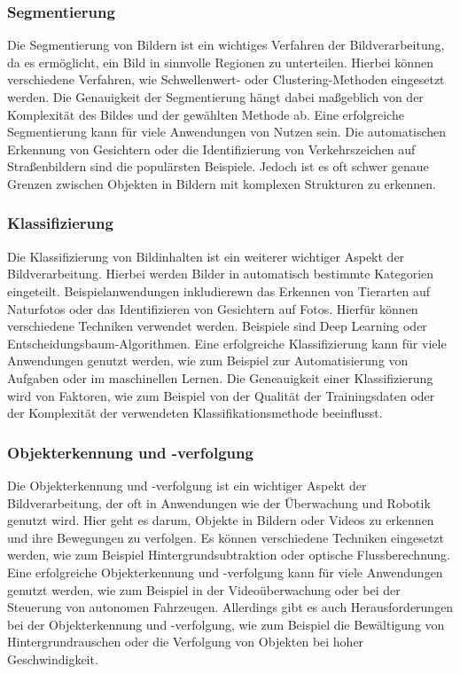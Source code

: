 \subsubsection{Segmentierung}

Die Segmentierung von Bildern ist ein wichtiges Verfahren der Bildverarbeitung, da es ermöglicht, ein Bild in sinnvolle Regionen zu unterteilen. 
Hierbei können verschiedene Verfahren, wie Schwellenwert- oder Clustering-Methoden eingesetzt werden. 
Die Genauigkeit der Segmentierung hängt dabei maßgeblich von der Komplexität des Bildes und der gewählten Methode ab.
Eine erfolgreiche Segmentierung kann für viele Anwendungen von Nutzen sein.
Die automatischen Erkennung von Gesichtern oder die Identifizierung von Verkehrszeichen auf Straßenbildern sind die populärsten Beispiele.
Jedoch ist es oft schwer genaue Grenzen zwischen Objekten in Bildern mit komplexen Strukturen zu erkennen.

\subsubsection{Klassifizierung}

Die Klassifizierung von Bildinhalten ist ein weiterer wichtiger Aspekt der Bildverarbeitung.
Hierbei werden Bilder in automatisch bestimmte Kategorien eingeteilt. 
Beispielanwendungen inkludierewn das Erkennen von Tierarten auf Naturfotos oder das Identifizieren von Gesichtern auf Fotos. 
Hierfür können verschiedene Techniken verwendet werden. Beispiele sind Deep Learning oder Entscheidungsbaum-Algorithmen.
Eine erfolgreiche Klassifizierung kann für viele Anwendungen genutzt werden, wie zum Beispiel zur Automatisierung von Aufgaben oder im maschinellen Lernen. 
Die Geneauigkeit einer Klassifizierung wird von Faktoren, wie zum Beispiel von der Qualität der Trainingsdaten oder der Komplexität der verwendeten Klassifikationsmethode beeinflusst.

\subsubsection{Objekterkennung und -verfolgung}

Die Objekterkennung und -verfolgung ist ein wichtiger Aspekt der Bildverarbeitung, der oft in Anwendungen wie der Überwachung und Robotik genutzt wird. 
Hier geht es darum, Objekte in Bildern oder Videos zu erkennen und ihre Bewegungen zu verfolgen. 
Es können verschiedene Techniken eingesetzt werden, wie zum Beispiel Hintergrundsubtraktion oder optische Flussberechnung.
Eine erfolgreiche Objekterkennung und -verfolgung kann für viele Anwendungen genutzt werden, wie zum Beispiel in der Videoüberwachung oder bei der Steuerung von autonomen Fahrzeugen. 
Allerdings gibt es auch Herausforderungen bei der Objekterkennung und -verfolgung, wie zum Beispiel die Bewältigung von Hintergrundrauschen oder die Verfolgung von Objekten bei hoher Geschwindigkeit.

